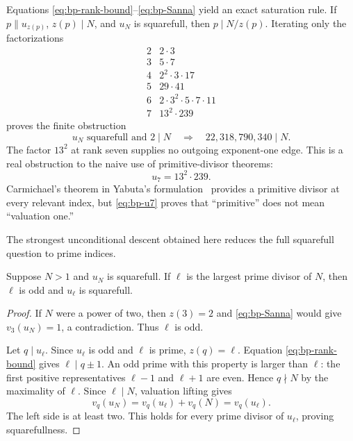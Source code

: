 Equations \eqref{eq:bp-rank-bound}--\eqref{eq:bp-Sanna} yield an exact
saturation rule.  If $p\parallel u_{z(p)}$, $z(p)\mid N$, and $u_N$ is
squarefull, then $p\mid N/z(p)$.  Iterating only the factorizations
\[
 \begin{array}{c|l}
 2&2\cdot3\\
 3&5\cdot7\\
 4&2^2\cdot3\cdot17\\
 5&29\cdot41\\
 6&2\cdot3^2\cdot5\cdot7\cdot11\\
 7&13^2\cdot239
 \end{array}
\]
proves the finite obstruction
\begin{equation}\label{eq:bp-index-saturation}
 u_N\text{ squarefull and }2\mid N
 \quad\Longrightarrow\quad
       22{,}318{,}790{,}340\mid N.
\end{equation}
The factor $13^2$ at rank seven supplies no outgoing exponent-one edge.  This
is a real obstruction to the naive use of primitive-divisor theorems:
\begin{equation}\label{eq:bp-u7}
                         u_7=13^2\cdot239.
\end{equation}
Carmichael's theorem in Yabuta's formulation~\cite{Yabuta2001} provides a
primitive divisor at every relevant index, but \eqref{eq:bp-u7} proves that
``primitive'' does not mean ``valuation one.''

The strongest unconditional descent obtained here reduces the full
squarefull question to prime indices.

\begin{theorem}
\label{thm:bp-largest-prime-descent}
Suppose $N>1$ and $u_N$ is squarefull.  If $\ell$ is the largest prime
divisor of $N$, then $\ell$ is odd and $u_\ell$ is squarefull.
\end{theorem}

\begin{proof}
If $N$ were a power of two, then $z(3)=2$ and
\eqref{eq:bp-Sanna} would give $v_3(u_N)=1$, a contradiction.  Thus $\ell$
is odd.

Let $q\mid u_\ell$.  Since $u_\ell$ is odd and $\ell$ is prime,
$z(q)=\ell$.  Equation \eqref{eq:bp-rank-bound} gives $\ell\mid q\pm1$.
An odd prime with this property is larger than $\ell$: the first positive
representatives $\ell-1$ and $\ell+1$ are even.  Hence $q\nmid N$ by the
maximality of $\ell$.  Since $\ell\mid N$, valuation lifting gives
\[
                         v_q(u_N)=v_q(u_\ell)+v_q(N)=v_q(u_\ell).
\]
The left side is at least two.  This holds for every prime divisor of
$u_\ell$, proving squarefullness.
\end{proof}

